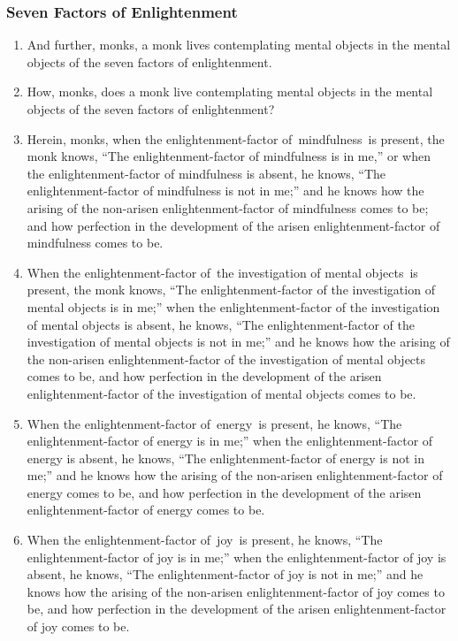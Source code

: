\subsubsection*{Seven Factors of Enlightenment}
\begin{enumerate}[resume]
\item And further, monks, a monk lives contemplating mental objects in the mental objects of the seven factors of enlightenment.
\item How, monks, does a monk live contemplating mental objects in the mental objects of the seven factors of enlightenment?
\item Herein, monks, when the enlightenment-factor of mindfulness is present, the monk knows, “The enlightenment-factor of mindfulness is in me,” or when the enlightenment-factor of mindfulness is absent, he knows, “The enlightenment-factor of mindfulness is not in me;” and he knows how the arising of the non-arisen enlightenment-factor of mindfulness comes to be; and how perfection in the development of the arisen enlightenment-factor of mindfulness comes to be.
\item When the enlightenment-factor of the investigation of mental objects is present, the monk knows, “The enlightenment-factor of the investigation of mental objects is in me;” when the enlightenment-factor of the investigation of mental objects is absent, he knows, “The enlightenment-factor of the investigation of mental objects is not in me;” and he knows how the arising of the non-arisen enlightenment-factor of the investigation of mental objects comes to be, and how perfection in the development of the arisen enlightenment-factor of the investigation of mental objects comes to be.
\item When the enlightenment-factor of energy is present, he knows, “The enlightenment-factor of energy is in me;” when the enlightenment-factor of energy is absent, he knows, “The enlightenment-factor of energy is not in me;” and he knows how the arising of the non-arisen enlightenment-factor of energy comes to be, and how perfection in the development of the arisen enlightenment-factor of energy comes to be.
\item When the enlightenment-factor of joy is present, he knows, “The enlightenment-factor of joy is in me;” when the enlightenment-factor of joy is absent, he knows, “The enlightenment-factor of joy is not in me;” and he knows how the arising of the non-arisen enlightenment-factor of joy comes to be, and how perfection in the development of the arisen enlightenment-factor of joy comes to be.

\end{enumerate}
